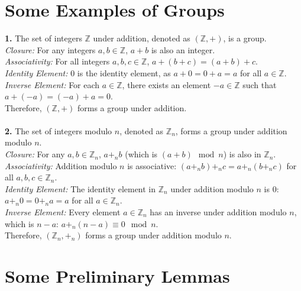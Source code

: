 \section{Some Examples of Groups}
\textbf{1.} The set of integers \(\mathbb{Z}\) under addition, denoted as \((\mathbb{Z}, +)\), is a group.\\
\textit{Closure:} For any integers \(a, b \in \mathbb{Z}\), \(a + b\) is also an integer.\\
\textit{Associativity:} For all integers \(a, b, c \in \mathbb{Z}\), \(a + (b + c) = (a + b) + c\).\\
\textit{Identity Element:} \(0\) is the identity element, as \(a + 0 = 0 + a = a\) for all \(a \in \mathbb{Z}\).\\
\textit{Inverse Element:} For each \(a \in \mathbb{Z}\), there exists an element \(-a \in \mathbb{Z}\) such that \(a + (-a) = (-a) + a = 0\).\\
Therefore, \((\mathbb{Z}, +)\) forms a group under addition.
\\\\
\textbf{2.} The set of integers modulo \( n \), denoted as \( \mathbb{Z}_n \), forms a group under addition modulo \( n \).
\\
\textit{Closure:} For any \( a, b \in \mathbb{Z}_n \), \( a +_n b \) (which is \( (a + b) \mod n \)) is also in \( \mathbb{Z}_n \).
\\
\textit{Associativity:} Addition modulo \( n \) is associative: \( (a +_n b) +_n c = a +_n (b +_n c) \) for all \( a, b, c \in \mathbb{Z}_n \).
\\
\textit{Identity Element:} The identity element in \( \mathbb{Z}_n \) under addition modulo \( n \) is \( 0 \): \( a +_n 0 = 0 +_n a = a \) for all \( a \in \mathbb{Z}_n \).
\\
\textit{Inverse Element:} Every element \( a \in \mathbb{Z}_n \) has an inverse under addition modulo \( n \), which is \( n - a \): \( a +_n (n - a) \equiv 0 \mod n \).
\\
Therefore, \( (\mathbb{Z}_n, +_n) \) forms a group under addition modulo \( n \).
\section{Some Preliminary Lemmas}
\newtheorem{lemma}{Lemma}

